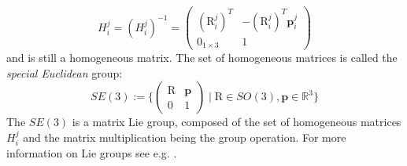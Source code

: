 \documentclass[a4paper,twoside, openright,12pt]{report}
\newcommand{\f}[1]{\boldsymbol{#1}}
\newcommand{\g}[1]{\text{#1}}
\begin{document}
{\[H_i^j = (H_i^j)^{-1} = \begin{pmatrix}(\g{R}_i^j)^T & -(\g{R}_i^j)^T \f{p}_i^j \\ 0_{1 \times 3} & 1\end{pmatrix} \]
and is still a homogeneous matrix.
The set of homogeneous matrices is called the \emph{special Euclidean} group:
\begin{equation}
	SE(3) := \{\begin{pmatrix}\g{R} & \f{p}\\0 & 1\end{pmatrix} \; | \; \g{R} \in SO(3), \f{p} \in \mathbb{R}^3\} 
\end{equation}
The $SE(3)$ is a matrix Lie group, composed of the set of homogeneous matrices $H_i^j$ and the matrix multiplication being the group operation. For more information on Lie groups see e.g. \cite{Stramigioli_01}.
}
\end{document}
